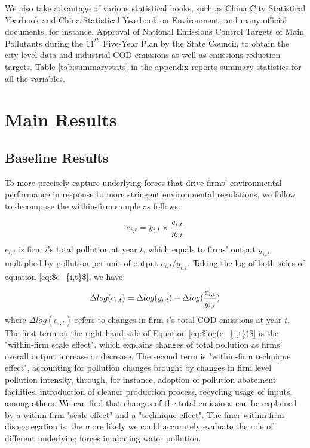\documentclass[12pt,english]{article}
\begin{document}
We also take advantage of various statistical books, such as China City Statistical Yearbook and China Statistical Yearbook on Environment, and many official documents, for instance, Approval of National Emissions Control Targets of Main Pollutants during the $11^{th}$ Five-Year Plan by the State Council, to obtain the city-level data and industrial COD emissions as well as emissions reduction targets. Table \ref{tab:summarystats} in the appendix reports summary statistics for all the variables.

\section{Main Results}\label{sec:results}

\subsection{Baseline Results} \label{sec:baseline}

To more precisely capture underlying forces that drive firms' environmental performance in response to more stringent environmental regulations, we follow \citet*{martin2011energy} to decompose the within-firm sample as follows:

\begin{equation}\label{eq:$e_{i,t}$}
e_{i,t}=y_{i,t}\times\dfrac{e_{i,t}}{y_{i,t}}
\end{equation}
$e_{i,t}$ is firm $i$'s total pollution at year $t$, which equals to firms' output $y_{i,t}$ multiplied by pollution per unit of output ${e_{i,t}}/{y_{i,t}}$. Taking the log of both sides of equation \ref{eq:$e_{i,t}$}, we have:

\begin{equation}\label{eq:$log(e_{i,t})$}
\Delta log(e_{i,t})=\Delta log(y_{i,t})+\Delta log(\dfrac{e_{i,t}}{y_{i,t}})
\end{equation}
where $\Delta log(e_{i,t})$ refers to changes in firm $i$'s total COD emissions at year $t$. The first term on the right-hand side of Equation \ref{eq:$log(e_{i,t})$} is the "within-firm scale effect", which explains changes of total pollution as firms' overall output increase or decrease. The second term is "within-firm technique effect", accounting for pollution changes brought by changes in firm level pollution intensity, through, for instance, adoption of pollution abatement facilities, introduction of cleaner production process, recycling usage of inputs, among others. We can find that changes of the total emissions can be explained by a within-firm "scale effect" and a "technique effect". The finer within-firm disaggregation is, the more likely we could accurately evaluate the role of different underlying forces in abating water pollution.
\end{document}
